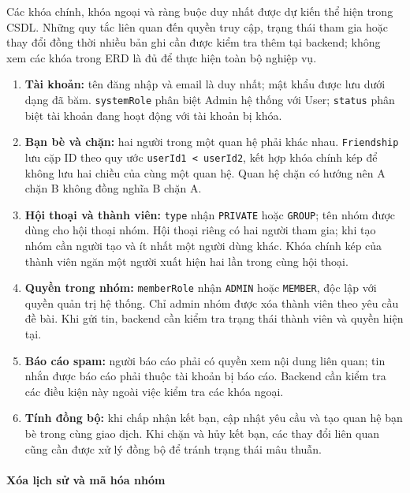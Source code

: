 Các khóa chính, khóa ngoại và ràng buộc duy nhất được dự kiến thể hiện trong
CSDL. Những quy tắc liên quan đến quyền truy cập, trạng thái tham gia hoặc
thay đổi đồng thời nhiều bản ghi cần được kiểm tra thêm tại backend;
không xem các khóa trong ERD là đủ để thực hiện toàn bộ nghiệp vụ.

\begin{enumerate}
  \item \textbf{Tài khoản:} tên đăng nhập và email là duy nhất;
    mật khẩu được lưu dưới dạng đã băm. \texttt{systemRole} phân biệt
    Admin hệ thống với User; \texttt{status} phân biệt tài khoản đang hoạt động
    với tài khoản bị khóa.
  \item \textbf{Bạn bè và chặn:} hai người trong một quan hệ phải khác nhau.
    \texttt{Friendship} lưu cặp ID theo quy ước
    \texttt{userId1 < userId2}, kết hợp khóa chính kép để không lưu
    hai chiều của cùng một quan hệ. Quan hệ chặn có hướng nên A chặn B
    không đồng nghĩa B chặn A.
  \item \textbf{Hội thoại và thành viên:} \texttt{type} nhận
    \texttt{PRIVATE} hoặc \texttt{GROUP}; tên nhóm được dùng cho hội thoại nhóm.
    Hội thoại riêng có hai người tham gia; khi tạo nhóm cần người tạo và
    ít nhất một người dùng khác. Khóa chính kép của thành viên ngăn một
    người xuất hiện hai lần trong cùng hội thoại.
  \item \textbf{Quyền trong nhóm:} \texttt{memberRole} nhận
    \texttt{ADMIN} hoặc \texttt{MEMBER}, độc lập với quyền quản trị hệ thống.
    Chỉ admin nhóm được xóa thành viên theo yêu cầu đề bài.
    Khi gửi tin, backend cần kiểm tra trạng thái thành viên và quyền hiện tại.
  \item \textbf{Báo cáo spam:} người báo cáo phải có quyền xem nội dung
    liên quan; tin nhắn được báo cáo phải thuộc tài khoản bị báo cáo.
    Backend cần kiểm tra các điều kiện này ngoài việc kiểm tra các khóa ngoại.
  \item \textbf{Tính đồng bộ:} khi chấp nhận kết bạn, cập nhật yêu cầu và tạo
    quan hệ bạn bè trong cùng giao dịch. Khi chặn và hủy kết bạn, các thay đổi
    liên quan cũng cần được xử lý đồng bộ để tránh trạng thái mâu thuẫn.
\end{enumerate}

\paragraph{Xóa lịch sử và mã hóa nhóm}
\mbox{}\par

